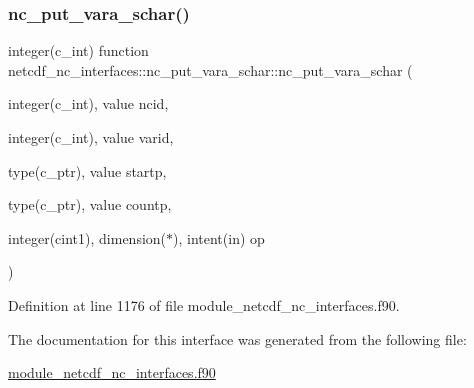 \subsubsection{\texorpdfstring{nc\+\_\+put\+\_\+vara\+\_\+schar()}{nc\_put\_vara\_schar()}}
{\footnotesize\ttfamily integer(c\+\_\+int) function netcdf\+\_\+nc\+\_\+interfaces\+::nc\+\_\+put\+\_\+vara\+\_\+schar\+::nc\+\_\+put\+\_\+vara\+\_\+schar (\begin{DoxyParamCaption}\item[{integer(c\+\_\+int), value}]{ncid,  }\item[{integer(c\+\_\+int), value}]{varid,  }\item[{type(c\+\_\+ptr), value}]{startp,  }\item[{type(c\+\_\+ptr), value}]{countp,  }\item[{integer(cint1), dimension($\ast$), intent(in)}]{op }\end{DoxyParamCaption})}



Definition at line 1176 of file module\+\_\+netcdf\+\_\+nc\+\_\+interfaces.\+f90.



The documentation for this interface was generated from the following file\+:\begin{DoxyCompactItemize}
\item 
\hyperlink{module__netcdf__nc__interfaces_8f90}{module\+\_\+netcdf\+\_\+nc\+\_\+interfaces.\+f90}\end{DoxyCompactItemize}
